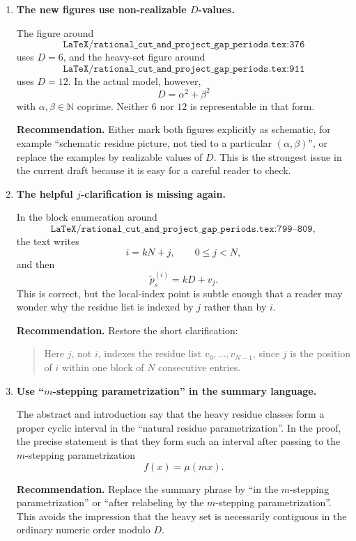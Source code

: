 \documentclass[11pt]{article}
\begin{document}
\begin{enumerate}[label=\textbf{F\arabic*.},leftmargin=*]

\item \textbf{The new figures use non-realizable \(D\)-values.}

The figure around
\[
\texttt{LaTeX/rational\_cut\_and\_project\_gap\_periods.tex:376}
\]
uses \(D=6\), and the heavy-set figure around
\[
\texttt{LaTeX/rational\_cut\_and\_project\_gap\_periods.tex:911}
\]
uses \(D=12\).  In the actual model, however,
\[
D=\alpha^2+\beta^2
\]
with \(\alpha,\beta\in\mathbb N\) coprime.  Neither \(6\) nor \(12\) is
representable in that form.

\textbf{Recommendation.}  Either mark both figures explicitly as schematic,
for example ``schematic residue picture, not tied to a particular
\((\alpha,\beta)\)'', or replace the examples by realizable values of \(D\).
This is the strongest issue in the current draft because it is easy for a
careful reader to check.

\item \textbf{The helpful \(j\)-clarification is missing again.}

In the block enumeration around
\[
\texttt{LaTeX/rational\_cut\_and\_project\_gap\_periods.tex:799--809},
\]
the text writes
\[
i=kN+j,\qquad 0\le j<N,
\]
and then
\[
\tilde p_s^{(i)}=kD+v_j.
\]
This is correct, but the local-index point is subtle enough that a reader may
wonder why the residue list is indexed by \(j\) rather than by \(i\).

\textbf{Recommendation.}  Restore the short clarification:
\begin{quote}
Here \(j\), not \(i\), indexes the residue list
\(v_0,\ldots,v_{N-1}\), since \(j\) is the position of \(i\) within one
block of \(N\) consecutive entries.
\end{quote}

\item \textbf{Use ``\(m\)-stepping parametrization'' in the summary language.}

The abstract and introduction say that the heavy residue classes form a
proper cyclic interval in the ``natural residue parametrization''.  In the
proof, the precise statement is that they form such an interval after passing
to the \(m\)-stepping parametrization
\[
f(x)=\mu(mx).
\]

\textbf{Recommendation.}  Replace the summary phrase by
``in the \(m\)-stepping parametrization'' or
``after relabeling by the \(m\)-stepping parametrization''.  This avoids the
impression that the heavy set is necessarily contiguous in the ordinary
numeric order modulo \(D\).


\end{enumerate}
\end{document}
